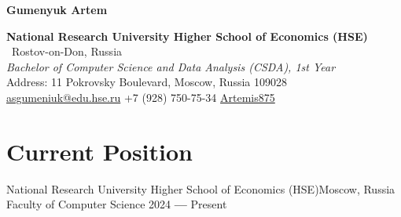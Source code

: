 \documentclass{OpenCV}
\newlength{\hvspace}
\begin{document}
\begin{center}
    \noindent\textbf{\LARGE Gumenyuk Artem} \\
\end{center}
\vspace{\hvspace}
\hrulefill
\vspace{\hvspace}
\begin{center}
    \noindent \textbf{National Research University Higher School of Economics (HSE)} \textbullet\ Rostov-on-Don, Russia \\
    \textit{Bachelor of Computer Science and Data Analysis (CSDA), 1st Year} \\
    \noindent Address: 11 Pokrovsky Boulevard, Moscow, Russia 109028 \\
    \noindent\faEnvelopeO\enskip \href{mailto:asgumeniuk@edu.hse.ru}{asgumeniuk@edu.hse.ru}\enskip
    \faPhone\enskip +7 (928) 750-75-34\enskip
    \faGithub\enskip \href{https://github.com/Artemis875}{Artemis875} \\
\end{center}
\vspace{\hvspace}
\vspace{-4pt}
\hrulefill
\vspace{-12pt}

\section*{Current Position}
\resumeSubHeadingListStart

\resumeSubheading
{National Research University Higher School of Economics (HSE)}{Moscow, Russia}
{Faculty of Computer Science}
{2024 \textbf{---} Present} 

\resumeSubHeadingListEnd




\end{document}
